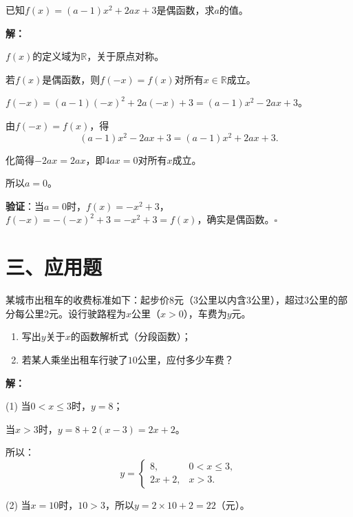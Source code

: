 \documentclass[12pt, a4paper]{ctexart}
\begin{document}
\vspace{6pt}

\begin{examplebox}[【例9】已知奇偶性求参数]
已知$f(x)=(a-1)x^2+2ax+3$是偶函数，求$a$的值。
\end{examplebox}

\textbf{解：}

$f(x)$的定义域为$\mathbb{R}$，关于原点对称。

若$f(x)$是偶函数，则$f(-x)=f(x)$对所有$x\in\mathbb{R}$成立。

$f(-x)=(a-1)(-x)^2+2a(-x)+3=(a-1)x^2-2ax+3$。

由$f(-x)=f(x)$，得
\[(a-1)x^2-2ax+3=(a-1)x^2+2ax+3.\]

化简得$-2ax=2ax$，即$4ax=0$对所有$x$成立。

所以$a=0$。

\textbf{验证}：当$a=0$时，$f(x)=-x^2+3$，$f(-x)=-(-x)^2+3=-x^2+3=f(x)$，确实是偶函数。$\square$

\newpage
\section*{\textcolor{apppurple}{三、应用题}}

\begin{appbox}[【应用1】出租车计费问题]
某城市出租车的收费标准如下：起步价$8$元（$3$公里以内含$3$公里），超过$3$公里的部分每公里$2$元。设行驶路程为$x$公里（$x>0$），车费为$y$元。
\begin{enumerate}[leftmargin=2em]
  \item 写出$y$关于$x$的函数解析式（分段函数）；
  \item 若某人乘坐出租车行驶了$10$公里，应付多少车费？
\end{enumerate}
\end{appbox}

\textbf{解：}

(1) 当$0<x\leq 3$时，$y=8$；

当$x>3$时，$y=8+2(x-3)=2x+2$。

所以：
\[
y =
\begin{cases}
8,     & 0<x\leq 3, \\
2x+2,  & x>3.
\end{cases}
\]

(2) 当$x=10$时，$10>3$，所以$y=2\times 10+2=22$（元）。
\end{document}
